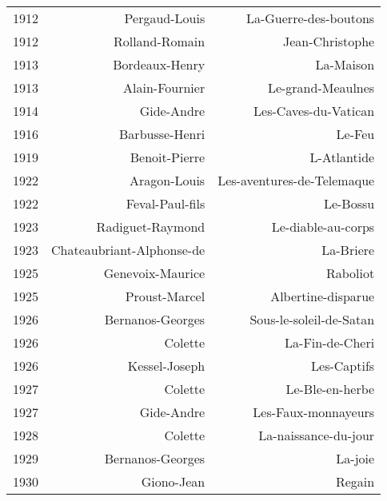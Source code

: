 \begin{xltabular}{\textwidth}{lrr}
1912 &                        Pergaud-Louis &                 La-Guerre-des-boutons \\
1912 &                       Rolland-Romain &                       Jean-Christophe \\
1913 &                       Bordeaux-Henry &                             La-Maison \\
1913 &                       Alain-Fournier &                     Le-grand-Meaulnes \\
1914 &                           Gide-Andre &                  Les-Caves-du-Vatican \\
1916 &                       Barbusse-Henri &                                Le-Feu \\
1919 &                        Benoit-Pierre &                           L-Atlantide \\
1922 &                         Aragon-Louis &            Les-aventures-de-Telemaque \\
1922 &                      Feval-Paul-fils &                              Le-Bossu \\
1923 &                     Radiguet-Raymond &                    Le-diable-au-corps \\
1923 &            Chateaubriant-Alphonse-de &                             La-Briere \\
1925 &                     Genevoix-Maurice &                              Raboliot \\
1925 &                        Proust-Marcel &                    Albertine-disparue \\
1926 &                     Bernanos-Georges &               Sous-le-soleil-de-Satan \\
1926 &                              Colette &                       La-Fin-de-Cheri \\
1926 &                        Kessel-Joseph &                           Les-Captifs \\
1927 &                              Colette &                       Le-Ble-en-herbe \\
1927 &                           Gide-Andre &                   Les-Faux-monnayeurs \\
1928 &                              Colette &                  La-naissance-du-jour \\
1929 &                     Bernanos-Georges &                               La-joie \\
1930 &                           Giono-Jean &                                Regain \\

\end{xltabular}
